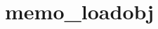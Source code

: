 \chapter{memo\+\_\+loadobj}
\hypertarget{md__doxygen_2memo__loadobj}{}\label{md__doxygen_2memo__loadobj}
